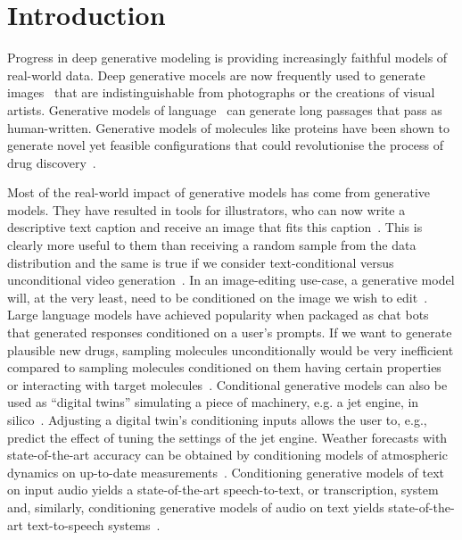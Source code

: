 \chapter{Introduction}
\label{ch:introduction}

Progress in deep generative modeling is providing increasingly faithful models of real-world data. Deep generative mocels are now frequently used to generate images~\citep{rombach2022high,ho2022imagen} that are indistinguishable from photographs or the creations of visual artists. Generative models of language~\cite{wolf2020transformers} can generate long passages that pass as human-written. Generative models of molecules like proteins have been shown to generate novel yet feasible configurations that could revolutionise the process of drug discovery~\citep{hoogeboom2022equivariant,watson2022broadly}. 

Most of the real-world impact of generative models has come from  generative models. 
They have resulted in tools for illustrators, who can now write a descriptive text caption and receive an image that fits this caption~\citep{rombach2022high,ho2022imagen}. This is clearly more useful to them than receiving a random sample from the data distribution and the same is true if we consider text-conditional versus unconditional video generation~\citep{ho2022video}. In an image-editing use-case, a generative model will, at the very least, need to be conditioned on the image we wish to edit~\citep{rombach2022high,sheynin2023emu}. Large language models have achieved popularity when packaged as chat bots~\cite{wolf2020transformers} that generated responses conditioned on a user's prompts. If we want to generate plausible new drugs, sampling molecules unconditionally would be very inefficient compared to sampling molecules conditioned on them having certain properties or interacting with target molecules~\citep{watson2022broadly}. Conditional generative models can also be used as ``digital twins'' simulating a piece of machinery, e.g. a jet engine, in silico~\citep{munk2022probabilistic,fuller2020digital}. Adjusting a digital twin's conditioning inputs allows the user to, e.g., predict the effect of tuning the settings of the jet engine. Weather forecasts with state-of-the-art accuracy can be obtained by conditioning models of atmospheric dynamics on up-to-date measurements~\citep{lam2022graphcast}. Conditioning generative models of text on input audio yields a state-of-the-art speech-to-text, or transcription, system~\citep{radford2023robust} and, similarly, conditioning generative models of audio on text yields state-of-the-art text-to-speech systems~\citep{tan2024naturalspeech}.


